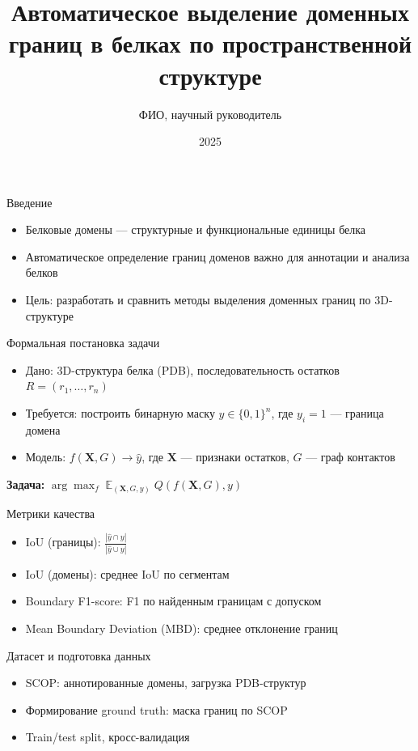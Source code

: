 \documentclass{beamer}
\title{Автоматическое выделение доменных границ в белках по пространственной структуре}
\author{ФИО, научный руководитель}
\date{2025}
\begin{document}
\begin{frame}
  \titlepage
\end{frame}

\begin{frame}{Введение}
  \begin{itemize}
    \item Белковые домены — структурные и функциональные единицы белка
    \item Автоматическое определение границ доменов важно для аннотации и анализа белков
    \item Цель: разработать и сравнить методы выделения доменных границ по 3D-структуре
  \end{itemize}
\end{frame}

\begin{frame}{Формальная постановка задачи}
  \begin{itemize}
    \item Дано: 3D-структура белка (PDB), последовательность остатков $R = (r_1, \ldots, r_n)$
    \item Требуется: построить бинарную маску $y \in \{0,1\}^n$, где $y_i=1$ — граница домена
    \item Модель: $f(\mathbf{X}, G) \to \hat{y}$, где $\mathbf{X}$ — признаки остатков, $G$ — граф контактов
  \end{itemize}
  \vspace{0.5em}
  \textbf{Задача:} $\arg\max_f \; \mathbb{E}_{(\mathbf{X}, G, y)} \; Q(f(\mathbf{X}, G), y)$
\end{frame}

\begin{frame}{Метрики качества}
  \begin{itemize}
    \item IoU (границы): $\frac{|\hat{y} \cap y|}{|\hat{y} \cup y|}$
    \item IoU (домены): среднее IoU по сегментам
    \item Boundary F1-score: F1 по найденным границам с допуском
    \item Mean Boundary Deviation (MBD): среднее отклонение границ
  \end{itemize}
\end{frame}

\begin{frame}{Датасет и подготовка данных}
  \begin{itemize}
    \item SCOP: аннотированные домены, загрузка PDB-структур
    \item Формирование ground truth: маска границ по SCOP
    \item Train/test split, кросс-валидация
  \end{itemize}
\end{frame}
\end{document}
